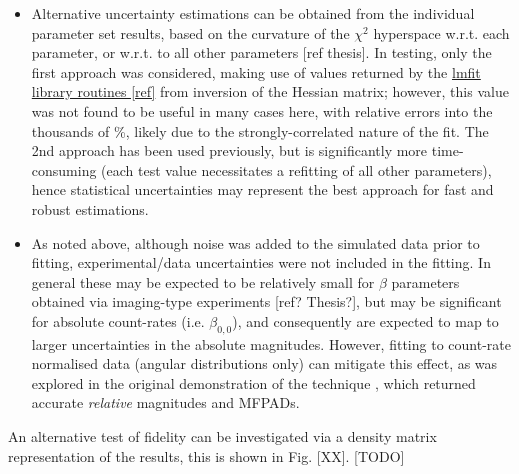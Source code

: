 \begin{itemize}
\begin{itemize}
\item Alternative uncertainty estimations can be obtained from the individual parameter set results, based on the curvature of the $\chi^2$ hyperspace w.r.t. each parameter, or w.r.t. to all other parameters [ref thesis]. In testing, only the first approach was considered, making use of values returned by the \href{https://lmfit.github.io/lmfit-py/fitting.html#uncertainties-in-variable-parameters-and-their-correlations}{lmfit library routines [ref]} from inversion of the Hessian matrix; however, this value was not found to be useful in many cases here, with relative errors into the thousands of \%, likely due to the strongly-correlated nature of the fit. The 2nd approach has been used previously, but is significantly more time-consuming (each test value necessitates a refitting of all other parameters), hence statistical uncertainties may represent the best approach for fast and robust estimations.
\item As noted above, although noise was added to the simulated data prior to fitting, experimental/data uncertainties were not included in the fitting. In general these may be expected to be relatively small for $\beta$ parameters obtained via imaging-type experiments [ref? Thesis?], but may be significant for absolute count-rates (i.e. $\beta_{0,0}$), and consequently are expected to map to larger uncertainties in the absolute magnitudes. However, fitting to count-rate normalised data (angular distributions only) can mitigate this effect, as was explored in the original demonstration of the technique \cite{marceau2017MolecularFrameReconstruction}, which returned accurate \textit{relative} magnitudes and MFPADs.
\end{itemize}

An alternative test of fidelity can be investigated via a density matrix representation of the results, this is shown in Fig. [XX]. [TODO]








\end{itemize}

